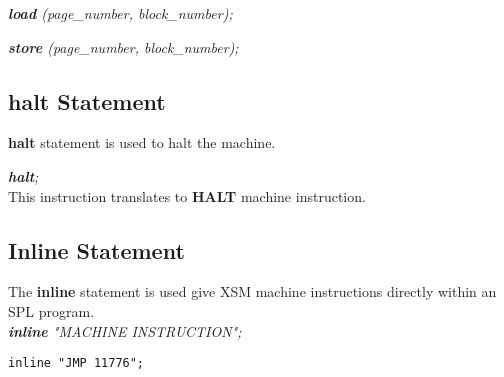 \documentclass[11pt]{article}
\begin{document}
\textit{\textbf{load} (page\_number, block\_number);}

\textit{\textbf{store} (page\_number, block\_number);}





\subsection{halt Statement}
\textbf{halt} statement is used to halt the machine. 

\textit{\textbf{halt};}\\

This instruction translates to \textbf{HALT} machine instruction.


\subsection{Inline Statement}
The \textbf{inline} statement is used give XSM machine instructions directly within an SPL program.\\

	\textit{\textbf{inline} \textit{"MACHINE INSTRUCTION"}; }
	
\begin{verbatim}
inline "JMP 11776";
\end{verbatim}
\end{document}
